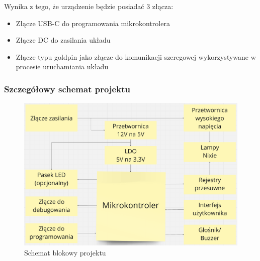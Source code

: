 \documentclass[../main.tex]{subfiles}
\begin{document}
Wynika z tego, że urządzenie będzie posiadać 3 złącza:
\begin{itemize}
    \item Złącze USB-C do programowania mikrokontrolera
    \item Złącze DC do zasilania układu
    \item Złącze typu goldpin jako złącze do komunikacji szeregowej wykorzystywane w procesie uruchamiania układu
\end{itemize}

\subsubsection{Szczegółowy schemat projektu}
\begin{figure}[H]
    \centering
    \includegraphics[width=1\textwidth]{schemat_szcz.png}
    \caption{Schemat blokowy projektu}
    \label{fig:schemat_projektu}
\end{figure}
\end{document}
